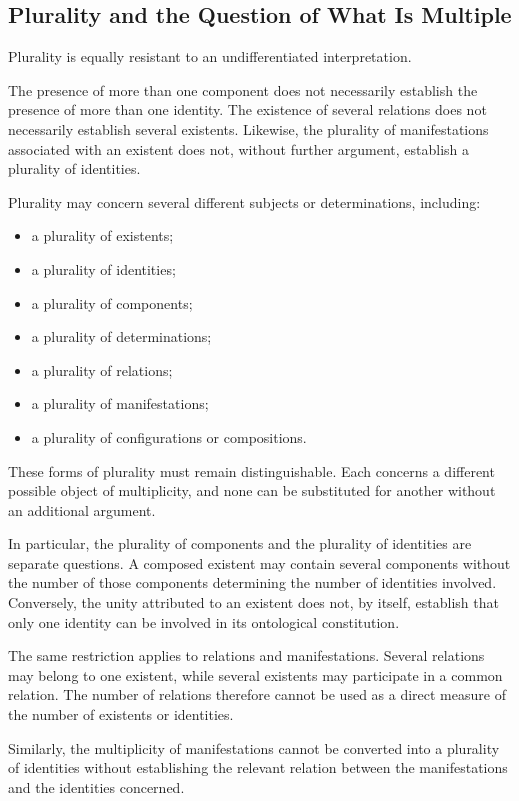 \subsection{Plurality and the Question of What Is Multiple}

Plurality is equally resistant to an undifferentiated
interpretation.

The presence of more than one component does not
necessarily establish the presence of more than
one identity. The existence of several relations
does not necessarily establish several existents.
Likewise, the plurality of manifestations associated
with an existent does not, without further argument,
establish a plurality of identities.

Plurality may concern several different subjects
or determinations, including:

\begin{itemize}
    \item a plurality of existents;
    \item a plurality of identities;
    \item a plurality of components;
    \item a plurality of determinations;
    \item a plurality of relations;
    \item a plurality of manifestations;
    \item a plurality of configurations or compositions.
\end{itemize}

These forms of plurality must remain distinguishable.
Each concerns a different possible object of
multiplicity, and none can be substituted for
another without an additional argument.

In particular, the plurality of components and
the plurality of identities are separate questions.
A composed existent may contain several components
without the number of those components determining
the number of identities involved. Conversely,
the unity attributed to an existent does not,
by itself, establish that only one identity
can be involved in its ontological constitution.

The same restriction applies to relations and
manifestations. Several relations may belong to
one existent, while several existents may participate
in a common relation. The number of relations
therefore cannot be used as a direct measure
of the number of existents or identities.

Similarly, the multiplicity of manifestations
cannot be converted into a plurality of identities
without establishing the relevant relation between
the manifestations and the identities concerned.

